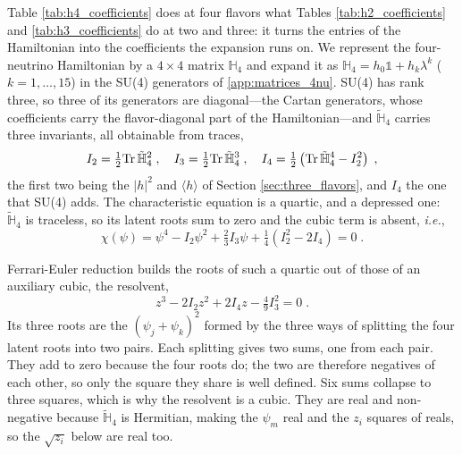 \documentclass[final,5p,times,twocolumn,sort,compress]{elsarticle}
\newcommand{\ie}{{\it i.e.}}
\begin{document}
Table \ref{tab:h4_coefficients} does at four flavors what Tables \ref{tab:h2_coefficients} and \ref{tab:h3_coefficients} do at two and three: it turns the entries of the Hamiltonian into the coefficients the expansion runs on.  We represent the four-neutrino Hamiltonian by a $4 \times 4$ matrix $\mathbb{H}_4$ and expand it as $\mathbb{H}_4 = h_0 \mathbb{1} + h_k \lambda^k$ ($k = 1, \ldots, 15$) in the SU(4) generators of \ref{app:matrices_4nu}.  SU(4) has rank three, so three of its generators are diagonal---the Cartan generators, whose coefficients carry the flavor-diagonal part of the Hamiltonian---and $\tilde{\mathbb{H}}_4$ carries three invariants, all obtainable from traces,
\begin{equation}
 \label{equ:invariants_4nu}
 I_2 = \tfrac{1}{2}{\rm Tr}\,\tilde{\mathbb{H}}_4^2 \;, \quad I_3 = \tfrac{1}{2}{\rm Tr}\,\tilde{\mathbb{H}}_4^3 \;, \quad I_4 = \tfrac{1}{2}\left({\rm Tr}\,\tilde{\mathbb{H}}_4^4 - I_2^2\right) \;,
\end{equation}
the first two being the $\lvert h \rvert^2$ and $\langle h \rangle$ of Section \ref{sec:three_flavors}, and $I_4$ the one that SU(4) adds.  The characteristic equation is a quartic, and a depressed one: $\tilde{\mathbb{H}}_4$ is traceless, so its latent roots sum to zero and the cubic term is absent, \ie,
\begin{equation}
 \chi\left(\psi\right) = \psi^4 - I_2\psi^2 + \tfrac{2}{3}I_3\psi + \tfrac{1}{4}\left(I_2^2 - 2I_4\right) = 0 \;.
\end{equation}

Ferrari-Euler reduction builds the roots of such a quartic out of those of an auxiliary cubic, the resolvent,
\begin{equation}
 \label{equ:resolvent_cubic}
 z^3 - 2I_2 z^2 + 2I_4 z - \tfrac{4}{9}I_3^2 = 0 \;.
\end{equation}
Its three roots are the $\left(\psi_j+\psi_k\right)^2$ formed by the three ways of splitting the four latent roots into two pairs.  Each splitting gives two sums, one from each pair.  They add to zero because the four roots do; the two are therefore negatives of each other, so only the square they share is well defined.  Six sums collapse to three squares, which is why the resolvent is a cubic.  They are real and non-negative because $\tilde{\mathbb{H}}_4$ is Hermitian, making the $\psi_m$ real and the $z_i$ squares of reals, so the $\sqrt{z_i}$ below are real too.  
\end{document}
